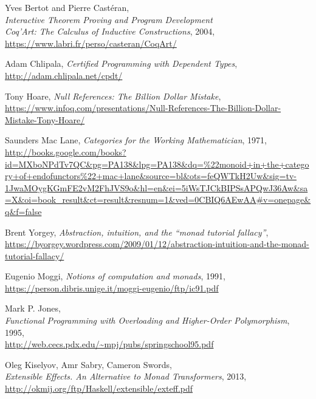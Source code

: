 \documentclass[declaration,inz,english,shortabstract]{iithesis}
\begin{document}
\begin{thebibliography}{1}
        Yves Bertot and Pierre Castéran, \\
        \textit{Interactive Theorem Proving and Program Development \\ Coq'Art: The Calculus of Inductive Constructions}, 2004, \\
        \url{https://www.labri.fr/perso/casteran/CoqArt/}

        Adam Chlipala,
        \textit{Certified Programming with Dependent Types}, \\
        \url{http://adam.chlipala.net/cpdt/}

        Tony Hoare,
        \textit{Null References: The Billion Dollar Mistake}, \\
        \url{https://www.infoq.com/presentations/Null-References-The-Billion-Dollar-Mistake-Tony-Hoare/}
    
        Saunders Mac Lane,
        \textit{Categories for the Working Mathematician}, 1971, \\
        \url{http://books.google.com/books?id=MXboNPdTv7QC&pg=PA138&lpg=PA138&dq=%22monoid+in+the+category+of+endofunctors%22+mac+lane&source=bl&ots=feQWTkH2Uw&sig=tv-1JwaMOygKGmFE2vM2FhJVS9o&hl=en&ei=5iWsTJCkBIPSsAPQwJ36Aw&sa=X&oi=book_result&ct=result&resnum=1&ved=0CBIQ6AEwAA#v=onepage&q&f=false}

        Brent Yorgey, \textit{Abstraction, intuition, and the ``monad tutorial fallacy''}, \\
        \url{https://byorgey.wordpress.com/2009/01/12/abstraction-intuition-and-the-monad-tutorial-fallacy/}

        Eugenio Moggi,
        \textit{Notions of computation and monads}, 1991, \\
        \url{https://person.dibris.unige.it/moggi-eugenio/ftp/ic91.pdf}

        Mark P. Jones, \\
        \textit{Functional Programming with Overloading and Higher-Order Polymorphism}, 1995, \\
        \url{http://web.cecs.pdx.edu/~mpj/pubs/springschool95.pdf}

        Oleg Kiselyov, Amr Sabry, Cameron Swords, \\
        \textit{Extensible Effects. An Alternative to Monad Transformers}, 2013, \\
        \url{http://okmij.org/ftp/Haskell/extensible/exteff.pdf}


\end{thebibliography}
\end{document}
